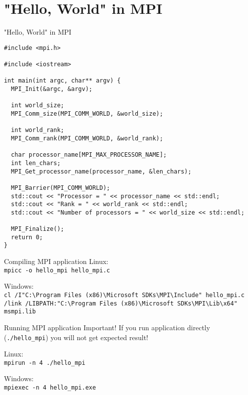 \documentclass{beamer}
\begin{document}
\section{"Hello, World" in MPI}

\begin{frame}[fragile]{"Hello, World" in MPI}

  \lstset{style=CStyle, caption=Basic application written using MPI}
  \begin{lstlisting}
#include <mpi.h>

#include <iostream>

int main(int argc, char** argv) {
  MPI_Init(&argc, &argv);

  int world_size;
  MPI_Comm_size(MPI_COMM_WORLD, &world_size);

  int world_rank;
  MPI_Comm_rank(MPI_COMM_WORLD, &world_rank);

  char processor_name[MPI_MAX_PROCESSOR_NAME];
  int len_chars;
  MPI_Get_processor_name(processor_name, &len_chars);

  MPI_Barrier(MPI_COMM_WORLD);
  std::cout << "Processor = " << processor_name << std::endl;
  std::cout << "Rank = " << world_rank << std::endl;
  std::cout << "Number of processors = " << world_size << std::endl;

  MPI_Finalize();
  return 0;
}
  \end{lstlisting}

\end{frame}

\begin{frame}[fragile]{Compiling MPI application}
  Linux: \\
  \texttt{mpicc -o hello\_mpi hello\_mpi.c}

  Windows: \\
  \texttt{cl /I"C:}\texttt{\textbackslash}\texttt{Program Files (x86)}\texttt{\textbackslash}\texttt{Microsoft SDKs}\texttt{\textbackslash}\texttt{MPI}\texttt{\textbackslash}\texttt{Include" hello\_mpi.c /link /LIBPATH:"C:}\texttt{\textbackslash}\texttt{Program Files (x86)}\texttt{\textbackslash}\texttt{Microsoft SDKs}\texttt{\textbackslash}\texttt{MPI}\texttt{\textbackslash}\texttt{Lib}\texttt{\textbackslash}\texttt{x64" msmpi.lib}

\end{frame}

\begin{frame}[fragile]{Running MPI application}
  Important! If you run application directly (\texttt{./hello\_mpi}) you will not get expected result!

  Linux: \\
  \texttt{mpirun -n 4 ./hello\_mpi}

  Windows: \\
  \texttt{mpiexec -n 4 hello\_mpi.exe}
\end{frame}
\end{document}
